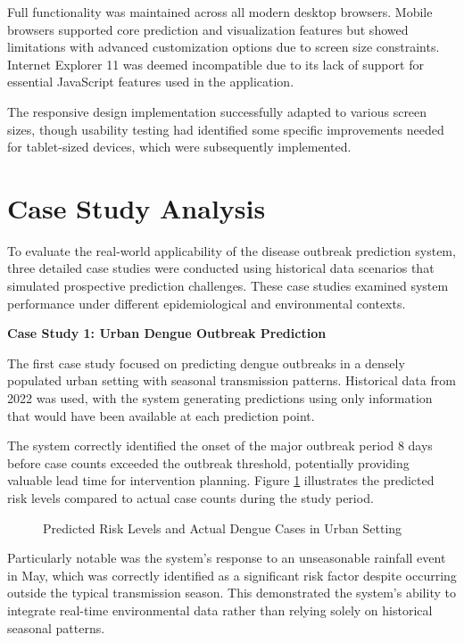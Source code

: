 \documentclass[12pt,a4paper]{report}
\begin{document}
Full functionality was maintained across all modern desktop browsers. Mobile browsers supported core prediction and visualization features but showed limitations with advanced customization options due to screen size constraints. Internet Explorer 11 was deemed incompatible due to its lack of support for essential JavaScript features used in the application.

The responsive design implementation successfully adapted to various screen sizes, though usability testing had identified some specific improvements needed for tablet-sized devices, which were subsequently implemented.

\section{Case Study Analysis}
To evaluate the real-world applicability of the disease outbreak prediction system, three detailed case studies were conducted using historical data scenarios that simulated prospective prediction challenges. These case studies examined system performance under different epidemiological and environmental contexts.

\textbf{Case Study 1: Urban Dengue Outbreak Prediction}

The first case study focused on predicting dengue outbreaks in a densely populated urban setting with seasonal transmission patterns. Historical data from 2022 was used, with the system generating predictions using only information that would have been available at each prediction point.

The system correctly identified the onset of the major outbreak period 8 days before case counts exceeded the outbreak threshold, potentially providing valuable lead time for intervention planning. Figure \ref{fig:case_study1} illustrates the predicted risk levels compared to actual case counts during the study period.

\begin{figure}[h]
\centering
\caption{Predicted Risk Levels and Actual Dengue Cases in Urban Setting}
\label{fig:case_study1}
\end{figure}

Particularly notable was the system's response to an unseasonable rainfall event in May, which was correctly identified as a significant risk factor despite occurring outside the typical transmission season. This demonstrated the system's ability to integrate real-time environmental data rather than relying solely on historical seasonal patterns.
\end{document}
